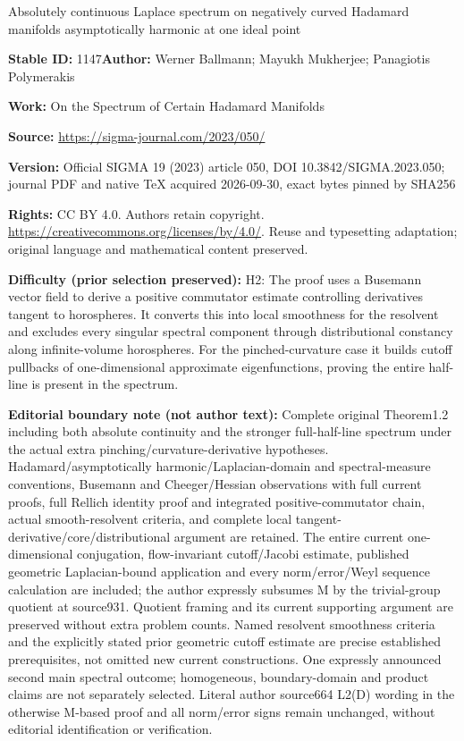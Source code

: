 \documentclass[11pt]{article}
\numberwithin{equation}{section}
\numberwithin{equation}{section}
\begin{document}
\begin{center}\Large Absolutely continuous Laplace spectrum on negatively curved Hadamard manifolds asymptotically harmonic at one ideal point\end{center}
\noindent\textbf{Stable ID:} 1147\quad\textbf{Author:} Werner Ballmann; Mayukh Mukherjee; Panagiotis Polymerakis\par
\noindent\textbf{Work:} On the Spectrum of Certain Hadamard Manifolds\par
\noindent\textbf{Source:} \url{https://sigma-journal.com/2023/050/}\par
\noindent\textbf{Version:} Official SIGMA 19 (2023) article 050, DOI 10.3842/SIGMA.2023.050; journal PDF and native TeX acquired 2026-09-30, exact bytes pinned by SHA256\par
\noindent\textbf{Rights:} CC BY 4.0. Authors retain copyright. \url{https://creativecommons.org/licenses/by/4.0/}. Reuse and typesetting adaptation; original language and mathematical content preserved.\par
\noindent\textbf{Difficulty (prior selection preserved):} {\CJKfont H2: The proof uses a Busemann vector field to derive a positive commutator estimate controlling derivatives tangent to horospheres. It converts this into local smoothness for the resolvent and excludes every singular spectral component through distributional constancy along infinite-volume horospheres. For the pinched-curvature case it builds cutoff pullbacks of one-dimensional approximate eigenfunctions, proving the entire half-line is present in the spectrum.}\par
\medskip\noindent\textbf{Editorial boundary note (not author text):} Complete original Theorem1.2 including both absolute continuity and the stronger full-half-line spectrum under the actual extra pinching/curvature-derivative hypotheses. Hadamard/asymptotically harmonic/Laplacian-domain and spectral-measure conventions, Busemann and Cheeger/Hessian observations with full current proofs, full Rellich identity proof and integrated positive-commutator chain, actual smooth-resolvent criteria, and complete local tangent-derivative/core/distributional argument are retained. The entire current one-dimensional conjugation, flow-invariant cutoff/Jacobi estimate, published geometric Laplacian-bound application and every norm/error/Weyl sequence calculation are included; the author expressly subsumes M by the trivial-group quotient at source931. Quotient framing and its current supporting argument are preserved without extra problem counts. Named resolvent smoothness criteria and the explicitly stated prior geometric cutoff estimate are precise established prerequisites, not omitted new current constructions. One expressly announced second main spectral outcome; homogeneous, boundary-domain and product claims are not separately selected. Literal author source664 L2(D) wording in the otherwise M-based proof and all norm/error signs remain unchanged, without editorial identification or verification.\par
\end{document}

